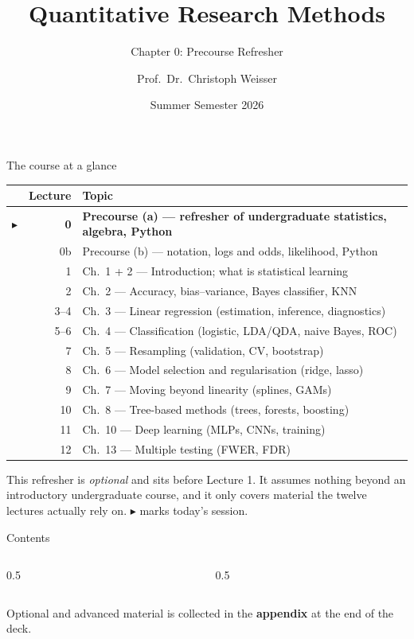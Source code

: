 \documentclass[aspectratio=169,11pt]{beamer}
\title{Quantitative Research Methods}
\subtitle{Chapter 0: Precourse Refresher}
\author{Prof.\ Dr.\ Christoph Weisser}\institute{HSBI}
\date{Summer Semester 2026}\graphicspath{{images/}}
\begin{document}
\begin{frame}[plain]\titlepage\end{frame}

\begin{frame}{The course at a glance}
  \footnotesize
  \begin{center}
  \begin{tabular}{@{}c r l@{}}
    & \textbf{Lecture} & \textbf{Topic}\\
    \midrule
    $\blacktriangleright$ & \textbf{0} & \textbf{Precourse (a) --- refresher of undergraduate statistics, algebra, Python} \\
     & 0b & Precourse (b) --- notation, logs and odds, likelihood, Python \\
     & 1 & Ch.\ 1 + 2 --- Introduction; what is statistical learning \\
     & 2 & Ch.\ 2 --- Accuracy, bias--variance, Bayes classifier, KNN \\
     & 3--4 & Ch.\ 3 --- Linear regression (estimation, inference, diagnostics) \\
     & 5--6 & Ch.\ 4 --- Classification (logistic, LDA/QDA, naive Bayes, ROC) \\
     & 7 & Ch.\ 5 --- Resampling (validation, CV, bootstrap) \\
     & 8 & Ch.\ 6 --- Model selection and regularisation (ridge, lasso) \\
     & 9 & Ch.\ 7 --- Moving beyond linearity (splines, GAMs) \\
     & 10 & Ch.\ 8 --- Tree-based methods (trees, forests, boosting) \\
     & 11 & Ch.\ 10 --- Deep learning (MLPs, CNNs, training) \\
     & 12 & Ch.\ 13 --- Multiple testing (FWER, FDR) \\
  \end{tabular}
  \end{center}
  \vspace{2pt}
  {\scriptsize This refresher is \emph{optional} and sits before Lecture 1. It assumes nothing
  beyond an introductory undergraduate course, and it only covers material the
  twelve lectures actually rely on. $\blacktriangleright$ marks today's session.}
\end{frame}

\begin{frame}{Contents}
  \begin{columns}[t]
    \begin{column}{0.5\textwidth}
      \tableofcontents[hideallsubsections,sections={1-6}]
    \end{column}
    \begin{column}{0.5\textwidth}
      \tableofcontents[hideallsubsections,sections={7-12}]
    \end{column}
  \end{columns}
  \vfill
  {\tiny Optional and advanced material is collected in the \textbf{appendix} at the end of the deck.}
\end{frame}
\end{document}

